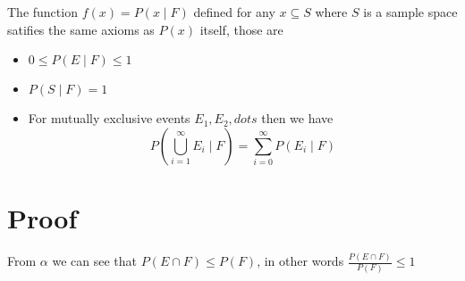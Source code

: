 \documentclass{article}
\begin{document}
The function $f\left(x\right) = P\left(x \mid F\right)$ defined for any $x \subseteq S$ where $S$ is a sample space satifies the same axioms as $P\left(x\right)$ itself, those are
\begin{itemize}
  \item $0 \le P\left(E \mid F\right) \le 1$ 
  \item $P\left(S \mid F\right) = 1$ 
  \item For mutually exclusive events $ E_{1} , E_{2} , dots $ then we have
    \[
    P\left( \bigcup_{i=1}^{\infty} E_{i} \mid F\right) = \sum_{i=0}^{\infty} P\left(E_{i} \mid F\right)
    \]
\end{itemize}

\section{Proof}

From $\alpha$ we can see that $P\left(E \cap F\right) \le P\left(F\right)$, in other words $\frac{P\left(E \cap F\right)}{P\left(F\right)} \le 1$ 
\end{document}
